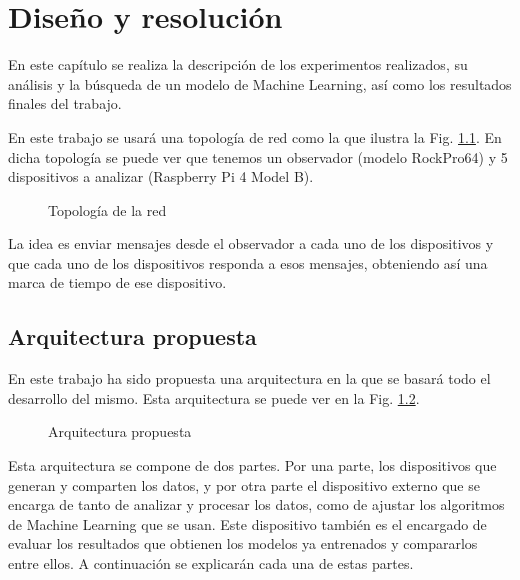 
\chapter{Diseño y resolución} \label{chap:diseno}

En este capítulo se realiza la descripción de los experimentos realizados, su análisis y la búsqueda de un modelo de Machine Learning, así como los resultados finales del trabajo.

En este trabajo se usará una topología de red como la que ilustra la Fig. \ref{fig:top}. En dicha topología se puede ver que tenemos un observador (modelo RockPro64) y 5 dispositivos a analizar (Raspberry Pi 4 Model B).

\begin{figure}[htpb!]
    \centering
    \resizebox{0.7\textwidth}{!}{
        
    }
    \caption{Topología de la red}
    \label{fig:top}
\end{figure}

La idea es enviar mensajes desde el observador a cada uno de los dispositivos y que cada uno de los dispositivos responda a esos mensajes, obteniendo así una marca de tiempo de ese dispositivo.

\section{Arquitectura propuesta}

En este trabajo ha sido propuesta una arquitectura en la que se basará todo el desarrollo del mismo. Esta arquitectura se puede ver en la Fig. \ref{fig:architecture}.

\begin{figure}[htpb!]
    \centering
    
    \caption{Arquitectura propuesta}
    \label{fig:architecture}
\end{figure}

Esta arquitectura se compone de dos partes. Por una parte, los dispositivos que generan y comparten los datos, y por otra parte el dispositivo externo que se encarga de tanto de analizar y procesar los datos, como de ajustar los algoritmos de Machine Learning que se usan. Este dispositivo también es el encargado de evaluar los resultados que obtienen los modelos ya entrenados y compararlos entre ellos. A continuación se explicarán cada una de estas partes.

